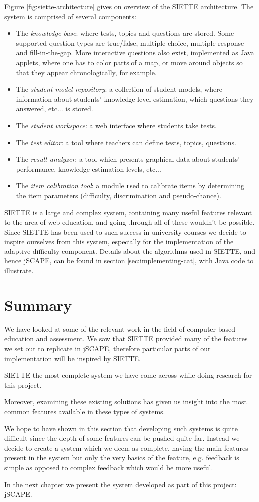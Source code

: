 Figure \ref{fig:siette-architecture} gives on overview of the SIETTE architecture. The system is comprised of several components\cite{SIETTE-components}:
\begin{itemize}
\item The \textit{knowledge base}: where tests, topics and questions are stored. Some supported question types are true/false, multiple choice, multiple response and fill-in-the-gap. More interactive questions also exist, implemented as Java applets, where one has to color parts of a map, or move around objects so that they appear chronologically, for example.
\item The \textit{student model repository}: a collection of student models, where information about students' knowledge level estimation, which questions they answered, etc... is stored.
\item The \textit{student workspace}: a web interface where students take tests.
\item The \textit{test editor}: a tool where teachers can define tests, topics, questions.
\item The \textit{result analyzer}: a tool which presents graphical data about students' performance, knowledge estimation levels, etc...
\item The \textit{item calibration tool}: a module used to calibrate items by determining the item parameters (difficulty, discrimination and pseudo-chance).
\end{itemize}

SIETTE is a large and complex system, containing many useful features relevant to the area of web-education, and going through all of these wouldn't be possible. Since SIETTE has been used to such success in university courses we decide to inspire ourselves from this system, especially for the implementation of the adaptive difficulty component. Details about the algorithms used in SIETTE, and hence jSCAPE, can be found in section \ref{sec:implementing-cat}, with Java code to illustrate.

\section{Summary}
We have looked at some of the relevant work in the field of computer based education and assessment. We saw that SIETTE provided many of the features we set out to replicate in jSCAPE, therefore particular parts of our implementation will be inspired by SIETTE.

SIETTE the most complete system we have come across while doing research for this project.

Moreover, examining these existing solutions has given us insight into the most common features available in these types of systems.

We hope to have shown in this section that developing such systems is quite difficult since the depth of some features can be pushed quite far. Instead we decide to create a system which we deem as complete, having the main features present in the system but only the very basics of the feature, e.g. feedback is simple as opposed to complex feedback which would be more useful.

In the next chapter we present the system developed as part of this project: jSCAPE. 
